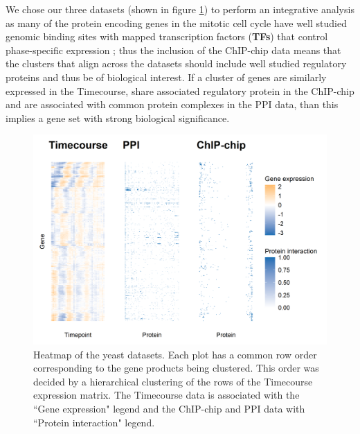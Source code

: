 \documentclass[]{article}
\begin{document}
We chose our three datasets (shown in figure \ref{fig:yeastData}) to perform an integrative analysis as many of the protein encoding genes in the mitotic cell cycle have well studied genomic binding sites with mapped transcription factors (\textbf{TFs}) that control phase-specific expression \citep{cho1998genome, spellman1998comprehensive}; thus the inclusion of the ChIP-chip data means that the clusters that align across the datasets should include well studied regulatory proteins and thus be of biological interest. If a cluster of genes are similarly expressed in the Timecourse, share associated regulatory protein in the ChIP-chip and are associated with common protein complexes in the PPI data, than this implies a gene set with strong biological significance.
\begin{figure}
	\centering
	\includegraphics[scale=0.7]{./Images/Yeast/yeastData.png}
	\caption{Heatmap of the yeast datasets. Each plot has a common row order corresponding to the gene products being clustered. This order was decided by a hierarchical clustering of the rows of the Timecourse expression matrix. The Timecourse data is associated with the ``Gene expression" legend and the ChIP-chip and PPI data with ``Protein interaction" legend.}
	\label{fig:yeastData}
\end{figure}
\end{document}
